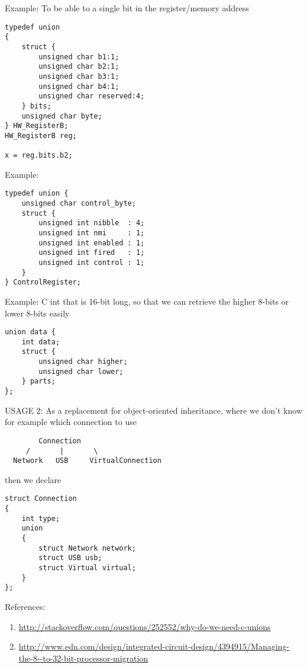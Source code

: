 Example: To be able to a single bit in the register/memory address
\begin{lstlisting}
typedef union
{
    struct {
        unsigned char b1:1;
        unsigned char b2:1;
        unsigned char b3:1;
        unsigned char b4:1;
        unsigned char reserved:4;
    } bits;
    unsigned char byte;
} HW_RegisterB;
HW_RegisterB reg;

x = reg.bits.b2;
\end{lstlisting}

Example:
\begin{lstlisting}
typedef union {
    unsigned char control_byte;
    struct {
        unsigned int nibble  : 4;
        unsigned int nmi     : 1;
        unsigned int enabled : 1;
        unsigned int fired   : 1;
        unsigned int control : 1;
    }
} ControlRegister;
\end{lstlisting}

Example: C int that is 16-bit long, so that we can retrieve the higher 8-bits or
lower 8-bits easily
\begin{lstlisting}
union data {
    int data;
    struct {
        unsigned char higher;
        unsigned char lower;
    } parts;
};
\end{lstlisting}

USAGE 2: As a replacement for object-oriented inheritance, where we don't know
for example which connection to use
\begin{lstlisting}
        Connection
     /       |       \
  Network   USB     VirtualConnection
\end{lstlisting}
then we declare
\begin{lstlisting}
struct Connection
{
    int type;
    union
    {
        struct Network network;
        struct USB usb;
        struct Virtual virtual;
    }
};
\end{lstlisting}



% 


References:
\begin{enumerate}
  \item \url{http://stackoverflow.com/questions/252552/why-do-we-need-c-unions}
  \item
  \url{http://www.edn.com/design/integrated-circuit-design/4394915/Managing-the-8--to-32-bit-processor-migration}
\end{enumerate}

